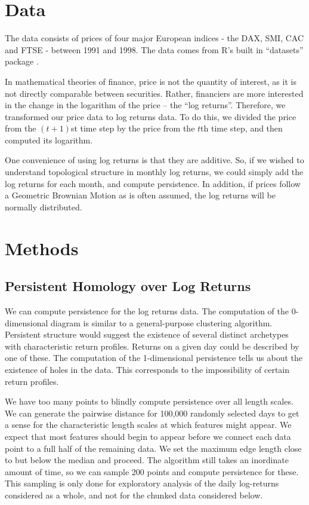 \documentclass{article}
\begin{document}
\section{Data}
The data consists of prices of four major European indices - the DAX, SMI, CAC and FTSE - between 1991 and 1998. The data comes from R's built in ``datasets'' package \cite{rprog}.

In mathematical theories of finance, price is not the quantity of interest, as it is not directly comparable between securities. Rather, financiers are more interested in the change in the logarithm of the price – the “log returns”. Therefore, we transformed our price data to log returns data. To do this, we divided the price from the $(t+1)$st time step by the price from the $t$th time step, and then computed its logarithm.

One convenience of using log returns is that they are additive. So, if we wished to understand topological structure in monthly log returns, we could simply add the log returns for each month, and compute persistence. In addition, if prices follow a Geometric Brownian Motion as is often assumed, the log returns will be normally distributed.

\newpage

\section{Methods}

\subsection{Persistent Homology over Log Returns}
We can compute persistence for the log returns data. The computation of the 0-dimensional diagram is similar to a general-purpose clustering algorithm. Persistent structure would suggest the existence of several distinct archetypes with characteristic return profiles. Returns on a given day could be described by one of these. The computation of the 1-dimensional persistence tells us about the existence of holes in the data. This corresponds to the impossibility of certain return profiles.

We have too many points to blindly compute persistence over all length scales. We can generate the pairwise distance for 100,000 randomly selected days to get a sense for the characteristic length scales at which features might appear. We expect that most features should begin to appear before we connect each data point to a full half of the remaining data. We set the maximum edge length close to but below the median and proceed. The algorithm still takes an inordinate amount of time, so we can sample 200 points and compute persistence for these. This sampling is only done for exploratory analysis of the daily log-returns considered as a whole, and not for the chunked data considered below.
\end{document}
